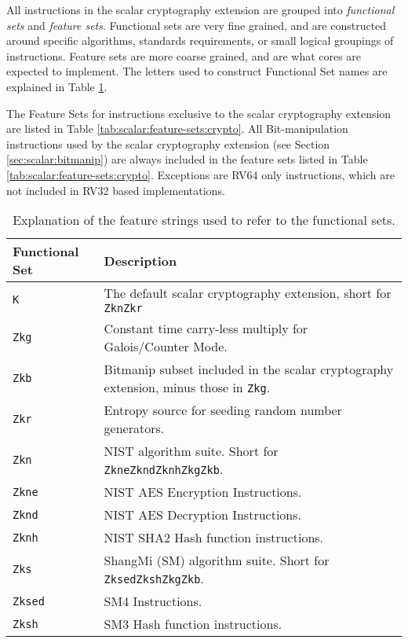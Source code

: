 
All instructions in the scalar cryptography extension are grouped into
{\em functional sets} and {\em feature sets}.
Functional sets are very fine grained, and are constructed around
specific algorithms, standards requirements, or small logical groupings
of instructions.
Feature sets are more coarse grained, and are what cores are expected
to implement.
The letters used to construct Functional Set names are explained in
Table \ref{tab:scalar:functional-sets}.

The Feature Sets for instructions exclusive to the scalar cryptography
extension are listed in
Table \ref{tab:scalar:feature-sets:crypto}.
All Bit-manipulation instructions used by the scalar cryptography extension
(see Section \ref{sec:scalar:bitmanip})
are always included in the feature sets listed in
Table \ref{tab:scalar:feature-sets:crypto}.
Exceptions are RV64 only instructions, which are not included in RV32
based implementations.

\begin{table}[h]
\centering
\begin{tabular}{l|l}
Functional Set    & Description \\
\hline
       {\tt  K   }& The default scalar cryptography extension, short for {\tt ZknZkr}   \\
       {\tt Zkg  }& Constant time carry-less multiply for Galois/Counter Mode.          \\
       {\tt Zkb  }& Bitmanip subset included in the scalar cryptography extension, minus those in {\tt Zkg}. \\
       {\tt Zkr  }& Entropy source for seeding random number generators.                \\
       {\tt Zkn  }& NIST algorithm suite. Short for {\tt ZkneZkndZknhZkgZkb}.           \\
       {\tt Zkne }& NIST AES Encryption Instructions.                                   \\
       {\tt Zknd }& NIST AES Decryption Instructions.                                   \\
       {\tt Zknh }& NIST SHA2 Hash function instructions.                               \\
       {\tt Zks  }& ShangMi (SM) algorithm suite. Short for {\tt ZksedZkshZkgZkb}.   \\
       {\tt Zksed}& SM4 Instructions.                                        \\
       {\tt Zksh }& SM3 Hash function instructions.                                     \\
\hline
\end{tabular}
\caption{
    Explanation of the feature strings used to refer to the functional sets.
}
\label{tab:scalar:functional-sets}
\end{table}

